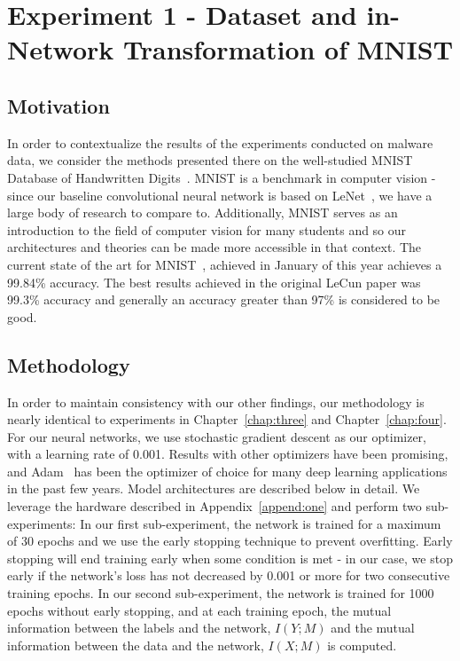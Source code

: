 \chapter{Experiment 1 - Dataset and in-Network Transformation of MNIST}
\label{chap:five}

\section{Motivation}
In order to contextualize the results of the experiments conducted on malware data, we consider the methods presented there on the well-studied MNIST Database of Handwritten Digits~\cite{lecun1998mnist}.
MNIST is a benchmark in computer vision - since our baseline convolutional neural network is based on LeNet~\cite{lecun1998gradient}, we have a large body of research to compare to.
Additionally, MNIST serves as an introduction to the field of computer vision for many students and so our architectures and theories can be made more accessible in that context.
The current state of the art for MNIST~\cite{byerly2020branching}, achieved in January of this year achieves a 99.84\% accuracy.
The best results achieved in the original LeCun paper was 99.3\% accuracy and generally an accuracy greater than 97\% is considered to be good.

\section{Methodology}
In order to maintain consistency with our other findings, our methodology is nearly identical to experiments in Chapter~\ref{chap:three} and Chapter~\ref{chap:four}.
For our neural networks, we use stochastic gradient descent as our optimizer, with a learning rate of 0.001.
Results with other optimizers have been promising, and Adam~\cite{kingma2014adam} has been the optimizer of choice for many deep learning applications in the past few years. 
Model architectures are described below in detail.
We leverage the hardware described in Appendix~\ref{append:one} and perform two sub-experiments:
In our first sub-experiment, the network is trained for a maximum of 30 epochs and we use the early stopping technique to prevent overfitting.
Early stopping will end training early when some condition is met - in our case, we stop early if the network's loss has not decreased by 0.001 or more for two consecutive training epochs.
In our second sub-experiment, the network is trained for 1000 epochs without early stopping, and at each training epoch, the mutual information between the labels and the network, $I(Y; M)$ and the mutual information between the data and the network, $I(X; M)$ is computed.

